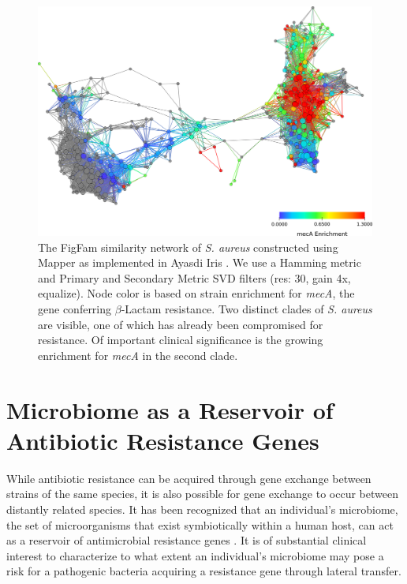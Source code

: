 \begin{figure}[t]
\centering
\includegraphics[width=\textwidth]{./fig/pathogens/saureus_figfam_network.png}
\caption[FigFam similarity network of \emph{S. aureus}]{The FigFam similarity network of \emph{S. aureus} constructed using Mapper as implemented in Ayasdi Iris \cite{AyasdiIris:2015}. We use a Hamming metric and Primary and Secondary Metric SVD filters (res: 30, gain 4x, equalize). Node color is based on strain enrichment for \emph{mecA}, the gene conferring $\beta$-Lactam resistance. Two distinct clades of \emph{S. aureus} are visible, one of which has already been compromised for resistance. Of important clinical significance is the growing enrichment for \emph{mecA} in the second clade.}
\label{fig:saureus_figfam_network}
\end{figure}

\section{Microbiome as a Reservoir of Antibiotic Resistance Genes}
\label{pathogens:microbiome}

While antibiotic resistance can be acquired through gene exchange between strains of the same species, it is also possible for gene exchange to occur between distantly related species.
It has been recognized that an individual's microbiome, the set of microorganisms that exist symbiotically within a human host, can act as a reservoir of antimicrobial resistance genes \cite{Sommer:2010uh,Penders:2013wt}.
It is of substantial clinical interest to characterize to what extent an individual's microbiome may pose a risk for a pathogenic bacteria acquiring a resistance gene through lateral transfer.

